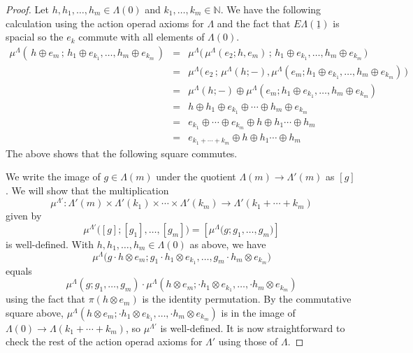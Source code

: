 \documentclass{amsbook} %
\newcommand{\EL}{E\Lambda}
\numberwithin{section}{chapter}
\begin{document}
\begin{proof}
Let $h, h_1, \ldots, h_m \in \Lambda(0)$ and $k_1, \ldots, k_m \in \mathbb{N}$. We have the following calculation using the action operad axioms for $\Lambda$ and the fact that $\EL(\underline{1})$ is spacial so the $e_k$ commute with all elements of $\Lambda(0)$.
\[ \begin{array}{rll}
		\mu^{\Lambda}( \, h \oplus e_m \, ; \, h_1 \oplus e_{k_1}, \ldots, h_m \oplus e_{k_m} \, ) & = & \mu^{\Lambda}\big( \, \mu^{\Lambda}(e_2; h, e_m) \, ; \, h_1 \oplus e_{k_1}, \ldots, h_m \oplus e_{k_m} \, \big) \\
		& = & \mu^{\Lambda}\big( \, e_2 \, ; \, \mu^{\Lambda}(h;-), \mu^{\Lambda}(e_m; h_1 \oplus e_{k_1}, \ldots, h_m \oplus e_{k_m}) \, \big) \\
		& = & \mu^{\Lambda}(h;-)\oplus \mu^{\Lambda}(e_m; h_1 \oplus e_{k_1}, \ldots, h_m \oplus e_{k_m})  \\
		& = & h \oplus h_1 \oplus e_{k_1} \oplus \cdots \oplus h_m \oplus e_{k_m} \\
		& = & e_{k_1} \oplus \cdots \oplus e_{k_m} \oplus h \oplus h_1 \cdots \oplus h_m \\
		& = & e_{k_1+\cdots+k_m} \oplus h \oplus h_1 \cdots \oplus h_m
		\end{array}
\]
The above shows that the following square commutes.
\begin{center}
\end{center}	

We write the image of $g \in \Lambda(m)$ under the quotient $\Lambda(m) \to \Lambda'(m)$ as $[g]$. We will show that the multiplication
\[
\mu^{\Lambda'} \colon \Lambda'(m) \times \Lambda'(k_1) \times \cdots \times \Lambda'(k_m) \to \Lambda'(k_1 + \cdots + k_m)
\]
given by 
\[
\mu^{\Lambda'}\Big( [g]; [g_1], \ldots , [g_m] \Big) = [\mu^{\Lambda}\Big(g; g_1, \ldots, g_m \Big)]
\]
is well-defined. With $h, h_1, \ldots, h_m \in \Lambda(0)$ as above, we have
\[
\mu^{\Lambda}\Big(g \cdot h \otimes e_m; g_1\cdot h_1 \otimes e_{k_1}, \ldots, g_m\cdot h_m \otimes e_{k_m} \Big) \]
equals
\[
\mu^{\Lambda}(g; g_1, \ldots, g_m) \cdot \mu^{\Lambda}(h \otimes e_m; \cdot h_1 \otimes e_{k_1}, \ldots, \cdot h_m \otimes e_{k_m})
\]
using the fact that $\pi(h \otimes e_m)$ is the identity permutation. By the commutative square above, $\mu^{\Lambda}(h \otimes e_m; \cdot h_1 \otimes e_{k_1}, \ldots, \cdot h_m \otimes e_{k_m})$ is in the image of $\Lambda(0) \to \Lambda(k_1 + \cdots + k_m)$, so $\mu^{\Lambda'}$ is well-defined. It is now straightforward to check the rest of the action operad axioms for $\Lambda'$ using those of $\Lambda$.
\end{proof}
\end{document}
